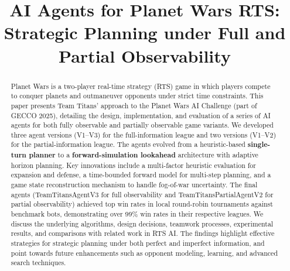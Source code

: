 \documentclass[conference]{IEEEtran}
\begin{document}
\sloppy
\raggedbottom
{}
\emergencystretch=10pt
\hfuzz=10pt
\vfuzz=10pt

\title{AI Agents for Planet Wars RTS: Strategic Planning under Full and Partial Observability}

\author{
\and
{}
\and
{}
}

\maketitle

\begin{abstract}
Planet Wars is a two-player real-time strategy (RTS) game in which players compete to conquer planets and outmaneuver opponents under strict time constraints. This paper presents Team Titans' approach to the Planet Wars AI Challenge (part of GECCO 2025), detailing the design, implementation, and evaluation of a series of AI agents for both fully observable and partially observable game variants. We developed three agent versions (V1--V3) for the full-information league and two versions (V1--V2) for the partial-information league. The agents evolved from a heuristic-based \textbf{single-turn planner} to a \textbf{forward-simulation lookahead} architecture with adaptive horizon planning. Key innovations include a multi-factor heuristic evaluation for expansion and defense, a time-bounded forward model for multi-step planning, and a game state reconstruction mechanism to handle fog-of-war uncertainty. The final agents (TeamTitansAgentV3 for full observability and TeamTitansPartialAgentV2 for partial observability) achieved top win rates in local round-robin tournaments against benchmark bots, demonstrating over 99\% win rates in their respective leagues. We discuss the underlying algorithms, design decisions, teamwork processes, experimental results, and comparisons with related work in RTS AI. The findings highlight effective strategies for strategic planning under both perfect and imperfect information, and point towards future enhancements such as opponent modeling, learning, and advanced search techniques.
\end{abstract}
\end{document}

